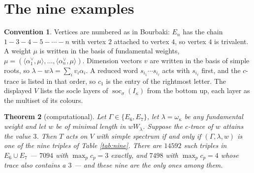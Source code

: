\documentclass[reqno]{amsart}
\theoremstyle{plain}
\newtheorem{theorem}{Theorem}[section]
\theoremstyle{definition}
\newtheorem{convention}[theorem]{Convention}
\DeclareMathOperator{\soc}{soc}
\newcommand{\la}{\lambda}
\newcommand{\al}{\alpha}
\newcommand{\om}{\omega}
\newcommand{\ka}{\kappa}
\begin{document}
\section{The nine examples}

\begin{convention}
Vertices are numbered as in Bourbaki: $E_n$ has the chain
$1-3-4-5-\cdots-n$ with vertex $2$ attached to vertex $4$, so vertex $4$ is
trivalent.  A weight $\mu$ is written in the basis of fundamental weights,
$\mu=(\langle\al_1^\vee,\mu\rangle,\dots,\langle\al_n^\vee,\mu\rangle)$.
Dimension vectors $v$ are written in the basis of simple roots, so
$\la-w\la=\sum_iv_i\al_i$.  A reduced word $s_{i_1}\cdots s_{i_\ell}$ acts with
$s_{i_\ell}$ first, and the $c$-trace is listed in that order, so $c_1$ is the
entry of the rightmost letter.  The displayed $V$ lists the socle layers of
$\soc_\sigma(I_\ka)$ from the bottom up, each layer as the multiset of its
colours.
\end{convention}

\begin{theorem}[computational]\label{thm:nine}
Let $\Gamma\in\{E_6,E_7\}$, let $\la=\om_\ka$ be any fundamental weight and
let $w$ be of minimal length in $wW_\la$.  Suppose the $c$-trace of $w$
attains the value $3$.  Then $T$ acts on $V$ with simple spectrum if and only
if $(\Gamma,\la,w)$ is one of the nine triples of Table \ref{tab:nine}.  There
are $14592$ such triples in $E_6\cup E_7$ --- $7094$ with
$\max_pc_p=3$ exactly, and $7498$ with $\max_pc_p=4$ whose trace also contains
a $3$ --- and these nine are the only ones among them.
\end{theorem}
\end{document}
